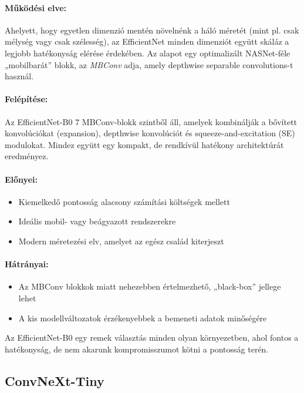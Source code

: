 \paragraph{Működési elve:} Ahelyett, hogy egyetlen dimenzió mentén növelnénk a háló méretét (mint pl. csak mélység vagy csak szélesség), az EfficientNet minden dimenziót együtt skáláz a legjobb hatékonyság elérése érdekében. Az alapot egy optimalizált NASNet-féle „mobilbarát” blokk, az \textit{MBConv} adja, amely depthwise separable convolutions-t használ.

\paragraph{Felépítése:} Az EfficientNet-B0 7 MBConv-blokk szintből áll, amelyek kombinálják a bővített konvolúciókat (expansion), depthwise konvolúciót és squeeze-and-excitation (SE) modulokat. Mindez együtt egy kompakt, de rendkívül hatékony architektúrát eredményez.

\paragraph{Előnyei:}
\begin{itemize}
    \item Kiemelkedő pontosság alacsony számítási költségek mellett
    \item Ideális mobil- vagy beágyazott rendszerekre
    \item Modern méretezési elv, amelyet az egész család kiterjeszt
\end{itemize}

\paragraph{Hátrányai:}
\begin{itemize}
    \item Az MBConv blokkok miatt nehezebben értelmezhető, „black-box” jellege lehet
    \item A kis modellváltozatok érzékenyebbek a bemeneti adatok minőségére
\end{itemize}

Az EfficientNet-B0 egy remek választás minden olyan környezetben, ahol fontos a hatékonyság, de nem akarunk kompromisszumot kötni a pontosság terén.

\subsection{ConvNeXt-Tiny}

